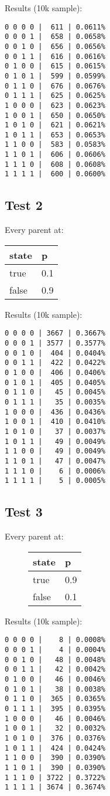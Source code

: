 \documentclass{article}
\begin{document}
Results (10k sample):
\begin{verbatim}
0 0 0 0 |  611 | 0.0611%
0 0 0 1 |  658 | 0.0658%
0 0 1 0 |  656 | 0.0656%
0 0 1 1 |  616 | 0.0616%
0 1 0 0 |  615 | 0.0615%
0 1 0 1 |  599 | 0.0599%
0 1 1 0 |  676 | 0.0676%
0 1 1 1 |  625 | 0.0625%
1 0 0 0 |  623 | 0.0623%
1 0 0 1 |  650 | 0.0650%
1 0 1 0 |  621 | 0.0621%
1 0 1 1 |  653 | 0.0653%
1 1 0 0 |  583 | 0.0583%
1 1 0 1 |  606 | 0.0606%
1 1 1 0 |  608 | 0.0608%
1 1 1 1 |  600 | 0.0600%
\end{verbatim}

\subsection{Test 2}
Every parent at:
\begin{longtable}{|l||p{2cm}|}
	\hline
	state & p \\\hline\hline
	true & 0.1 \\\hline
	false & 0.9 \\\hline
\end{longtable}

Results (10k sample):
\begin{verbatim}
0 0 0 0 | 3667 | 0.3667%
0 0 0 1 | 3577 | 0.3577%
0 0 1 0 |  404 | 0.0404%
0 0 1 1 |  422 | 0.0422%
0 1 0 0 |  406 | 0.0406%
0 1 0 1 |  405 | 0.0405%
0 1 1 0 |   45 | 0.0045%
0 1 1 1 |   35 | 0.0035%
1 0 0 0 |  436 | 0.0436%
1 0 0 1 |  410 | 0.0410%
1 0 1 0 |   37 | 0.0037%
1 0 1 1 |   49 | 0.0049%
1 1 0 0 |   49 | 0.0049%
1 1 0 1 |   47 | 0.0047%
1 1 1 0 |    6 | 0.0006%
1 1 1 1 |    5 | 0.0005%
\end{verbatim}

\subsection{Test 3}
Every parent at:
\begin{figure}
\begin{longtable}{|l||p{2cm}|}
	\hline
	state & p \\\hline\hline
	true & 0.9 \\\hline
	false & 0.1 \\\hline
\end{longtable}
\end{figure}

Results (10k sample):
\begin{verbatim}
0 0 0 0 |    8 | 0.0008%
0 0 0 1 |    4 | 0.0004%
0 0 1 0 |   48 | 0.0048%
0 0 1 1 |   42 | 0.0042%
0 1 0 0 |   46 | 0.0046%
0 1 0 1 |   38 | 0.0038%
0 1 1 0 |  365 | 0.0365%
0 1 1 1 |  395 | 0.0395%
1 0 0 0 |   46 | 0.0046%
1 0 0 1 |   32 | 0.0032%
1 0 1 0 |  376 | 0.0376%
1 0 1 1 |  424 | 0.0424%
1 1 0 0 |  390 | 0.0390%
1 1 0 1 |  390 | 0.0390%
1 1 1 0 | 3722 | 0.3722%
1 1 1 1 | 3674 | 0.3674%
\end{verbatim}
\end{document}
